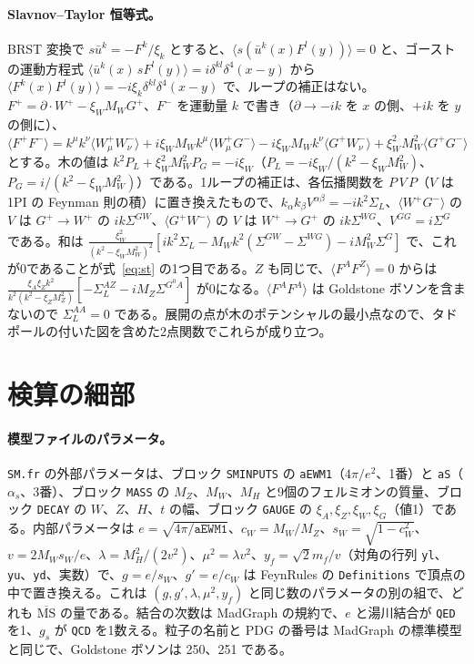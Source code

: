 \documentclass[a4paper,10pt]{ltjsarticle}
\newcommand{\MSbar}{\overline{\mathrm{MS}}}
\newcommand{\sw}{s_W}
\newcommand{\cw}{c_W}
\begin{document}
\paragraph{Slavnov--Taylor 恒等式。}BRST 変換で $s\bar u^k=-F^k/\xi_k$ とすると、$\langle s(\bar u^k(x)F^l(y))\rangle=0$ と、ゴーストの運動方程式 $\langle\bar u^k(x)\,sF^l(y)\rangle=i\delta^{kl}\delta^4(x-y)$ から $\langle F^k(x)F^l(y)\rangle=-i\xi_k\delta^{kl}\delta^4(x-y)$ で、ループの補正はない。$F^+=\partial\!\cdot\!W^+-\xi_WM_WG^+$、$F^-$ を運動量 $k$ で書き（$\partial\to-ik$ を $x$ の側、$+ik$ を $y$ の側に）、$\langle F^+F^-\rangle=k^\mu k^\nu\langle W^+_\mu W^-_\nu\rangle+i\xi_WM_Wk^\mu\langle W^+_\mu G^-\rangle-i\xi_WM_Wk^\nu\langle G^+W^-_\nu\rangle+\xi_W^2M_W^2\langle G^+G^-\rangle$ とする。木の値は $k^2P_L+\xi_W^2M_W^2P_G=-i\xi_W$（$P_L=-i\xi_W/(k^2-\xi_WM_W^2)$、$P_G=i/(k^2-\xi_WM_W^2)$）である。1ループの補正は、各伝播関数を $P\,V\,P$（$V$ は1PI の Feynman 則の積）に置き換えたもので、$k_\alpha k_\beta V^{\alpha\beta}=-ik^2\Sigma_L$、$\langle W^+G^-\rangle$ の $V$ は $G^+\to W^+$ の $ik\Sigma^{GW}$、$\langle G^+W^-\rangle$ の $V$ は $W^+\to G^+$ の $ik\Sigma^{WG}$、$V^{GG}=i\Sigma^G$ である。和は $\frac{\xi_W^2}{(k^2-\xi_WM_W^2)^2}[ik^2\Sigma_L-M_Wk^2(\Sigma^{GW}-\Sigma^{WG})-iM_W^2\Sigma^G]$ で、これが0であることが式~\eqref{eq:st} の1つ目である。$Z$ も同じで、$\langle F^AF^Z\rangle=0$ からは $\frac{\xi_A\xi_Zk^2}{k^2(k^2-\xi_ZM_Z^2)}[-\Sigma^{AZ}_L-iM_Z\Sigma^{G^0A}]$ が0になる。$\langle F^AF^A\rangle$ は Goldstone ボソンを含まないので $\Sigma^{AA}_L=0$ である。展開の点が木のポテンシャルの最小点なので、タドポールの付いた図を含めた2点関数でこれらが成り立つ。

\section{検算の細部}\label{app:details}

\paragraph{模型ファイルのパラメータ。}\texttt{SM.fr} の外部パラメータは、ブロック \texttt{SMINPUTS} の \texttt{aEWM1}（$4\pi/e^2$、1番）と \texttt{aS}（$\alpha_s$、3番）、ブロック \texttt{MASS} の $M_Z$、$M_W$、$M_H$ と9個のフェルミオンの質量、ブロック \texttt{DECAY} の $W$、$Z$、$H$、$t$ の幅、ブロック \texttt{GAUGE} の $\xi_A,\xi_Z,\xi_W,\xi_G$（値1）である。内部パラメータは $e=\sqrt{4\pi/\texttt{aEWM1}}$、$\cw=M_W/M_Z$、$\sw=\sqrt{1-\cw^2}$、$v=2M_W\sw/e$、$\lambda=M_H^2/(2v^2)$、$\mu^2=\lambda v^2$、$y_f=\sqrt2m_f/v$（対角の行列 \texttt{yl}、\texttt{yu}、\texttt{yd}、実数）で、$g=e/\sw$、$g'=e/\cw$ は FeynRules の \texttt{Definitions} で頂点の中で置き換える。これは $(g,g',\lambda,\mu^2,y_f)$ と同じ数のパラメータの別の組で、どれも $\MSbar$ の量である。結合の次数は MadGraph の規約で、$e$ と湯川結合が \texttt{QED} を1、$g_s$ が \texttt{QCD} を1数える。粒子の名前と PDG の番号は MadGraph の標準模型と同じで、Goldstone ボソンは 250、251 である。
\end{document}
